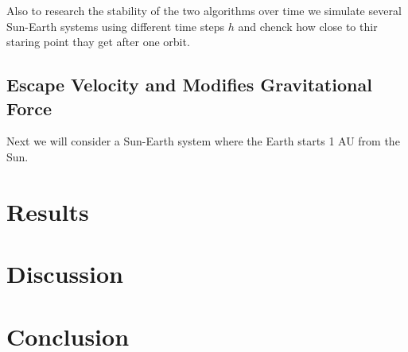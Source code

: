 \documentclass[twocolumn]{aastex62}
\begin{document}
Also to research the stability of the two algorithms over
time we simulate several Sun-Earth systems using different time steps $h$ and
chenck how close to thir staring point thay get after one orbit. 

\subsection{Escape Velocity and Modifies Gravitational Force}
Next we will consider a Sun-Earth system where the Earth starts 1 AU from the
Sun.


\section{Results} \label{sec:results}


\section{Discussion} \label{sec:discussion}

\section{Conclusion} \label{sec:conclusion}

\nocite{jensen:2019}
\newpage


\end{document}
